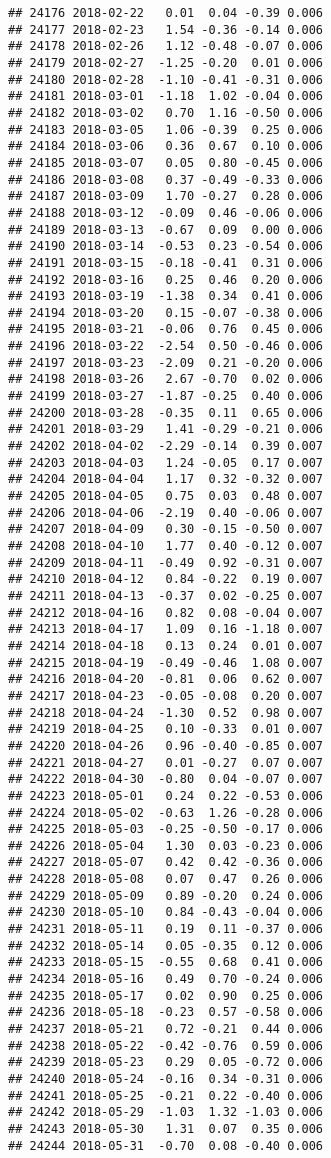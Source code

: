 \documentclass[
]{article}
\begin{document}
\begin{verbatim}
## 24176 2018-02-22   0.01  0.04 -0.39 0.006
## 24177 2018-02-23   1.54 -0.36 -0.14 0.006
## 24178 2018-02-26   1.12 -0.48 -0.07 0.006
## 24179 2018-02-27  -1.25 -0.20  0.01 0.006
## 24180 2018-02-28  -1.10 -0.41 -0.31 0.006
## 24181 2018-03-01  -1.18  1.02 -0.04 0.006
## 24182 2018-03-02   0.70  1.16 -0.50 0.006
## 24183 2018-03-05   1.06 -0.39  0.25 0.006
## 24184 2018-03-06   0.36  0.67  0.10 0.006
## 24185 2018-03-07   0.05  0.80 -0.45 0.006
## 24186 2018-03-08   0.37 -0.49 -0.33 0.006
## 24187 2018-03-09   1.70 -0.27  0.28 0.006
## 24188 2018-03-12  -0.09  0.46 -0.06 0.006
## 24189 2018-03-13  -0.67  0.09  0.00 0.006
## 24190 2018-03-14  -0.53  0.23 -0.54 0.006
## 24191 2018-03-15  -0.18 -0.41  0.31 0.006
## 24192 2018-03-16   0.25  0.46  0.20 0.006
## 24193 2018-03-19  -1.38  0.34  0.41 0.006
## 24194 2018-03-20   0.15 -0.07 -0.38 0.006
## 24195 2018-03-21  -0.06  0.76  0.45 0.006
## 24196 2018-03-22  -2.54  0.50 -0.46 0.006
## 24197 2018-03-23  -2.09  0.21 -0.20 0.006
## 24198 2018-03-26   2.67 -0.70  0.02 0.006
## 24199 2018-03-27  -1.87 -0.25  0.40 0.006
## 24200 2018-03-28  -0.35  0.11  0.65 0.006
## 24201 2018-03-29   1.41 -0.29 -0.21 0.006
## 24202 2018-04-02  -2.29 -0.14  0.39 0.007
## 24203 2018-04-03   1.24 -0.05  0.17 0.007
## 24204 2018-04-04   1.17  0.32 -0.32 0.007
## 24205 2018-04-05   0.75  0.03  0.48 0.007
## 24206 2018-04-06  -2.19  0.40 -0.06 0.007
## 24207 2018-04-09   0.30 -0.15 -0.50 0.007
## 24208 2018-04-10   1.77  0.40 -0.12 0.007
## 24209 2018-04-11  -0.49  0.92 -0.31 0.007
## 24210 2018-04-12   0.84 -0.22  0.19 0.007
## 24211 2018-04-13  -0.37  0.02 -0.25 0.007
## 24212 2018-04-16   0.82  0.08 -0.04 0.007
## 24213 2018-04-17   1.09  0.16 -1.18 0.007
## 24214 2018-04-18   0.13  0.24  0.01 0.007
## 24215 2018-04-19  -0.49 -0.46  1.08 0.007
## 24216 2018-04-20  -0.81  0.06  0.62 0.007
## 24217 2018-04-23  -0.05 -0.08  0.20 0.007
## 24218 2018-04-24  -1.30  0.52  0.98 0.007
## 24219 2018-04-25   0.10 -0.33  0.01 0.007
## 24220 2018-04-26   0.96 -0.40 -0.85 0.007
## 24221 2018-04-27   0.01 -0.27  0.07 0.007
## 24222 2018-04-30  -0.80  0.04 -0.07 0.007
## 24223 2018-05-01   0.24  0.22 -0.53 0.006
## 24224 2018-05-02  -0.63  1.26 -0.28 0.006
## 24225 2018-05-03  -0.25 -0.50 -0.17 0.006
## 24226 2018-05-04   1.30  0.03 -0.23 0.006
## 24227 2018-05-07   0.42  0.42 -0.36 0.006
## 24228 2018-05-08   0.07  0.47  0.26 0.006
## 24229 2018-05-09   0.89 -0.20  0.24 0.006
## 24230 2018-05-10   0.84 -0.43 -0.04 0.006
## 24231 2018-05-11   0.19  0.11 -0.37 0.006
## 24232 2018-05-14   0.05 -0.35  0.12 0.006
## 24233 2018-05-15  -0.55  0.68  0.41 0.006
## 24234 2018-05-16   0.49  0.70 -0.24 0.006
## 24235 2018-05-17   0.02  0.90  0.25 0.006
## 24236 2018-05-18  -0.23  0.57 -0.58 0.006
## 24237 2018-05-21   0.72 -0.21  0.44 0.006
## 24238 2018-05-22  -0.42 -0.76  0.59 0.006
## 24239 2018-05-23   0.29  0.05 -0.72 0.006
## 24240 2018-05-24  -0.16  0.34 -0.31 0.006
## 24241 2018-05-25  -0.21  0.22 -0.40 0.006
## 24242 2018-05-29  -1.03  1.32 -1.03 0.006
## 24243 2018-05-30   1.31  0.07  0.35 0.006
## 24244 2018-05-31  -0.70  0.08 -0.40 0.006
\end{verbatim}
\end{document}

